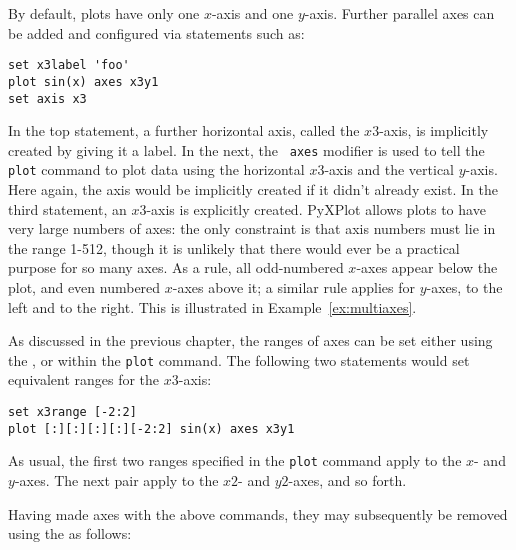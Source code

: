 By default, plots have only one $x$-axis and one $y$-axis. Further parallel
axes can be added and configured via statements such as:

\begin{verbatim}
set x3label 'foo'
plot sin(x) axes x3y1
set axis x3
\end{verbatim}

\noindent In the top statement, a further horizontal axis, called the
$x3$-axis, is implicitly created by giving it a label. In the next, the {\tt
axes} modifier is used to tell the {\tt plot} command to plot data using the
horizontal $x3$-axis and the vertical $y$-axis. Here again, the axis would be
implicitly created if it didn't already exist.  In the third statement, an
$x3$-axis is explicitly created.  PyXPlot allows plots to have very large
numbers of axes: the only constraint is that axis numbers must lie in the range
1-512, though it is unlikely that there would ever be a practical purpose for
so many axes.  As a rule, all odd-numbered $x$-axes appear below the plot, and
even numbered $x$-axes above it; a similar rule applies for $y$-axes, to the
left and to the right.  This is illustrated in Example~\ref{ex:multiaxes}.


As discussed in the previous chapter, the ranges of axes can be set either
using the , or within the {\tt plot} command. The following
two statements would set equivalent ranges for the $x3$-axis:

\begin{verbatim}
set x3range [-2:2]
plot [:][:][:][:][-2:2] sin(x) axes x3y1
\end{verbatim}

\noindent As usual, the first two ranges specified in the {\tt plot} command
apply to the $x$- and $y$-axes. The next pair apply to the $x2$- and $y2$-axes,
and so forth.

 Having made axes
with the above commands, they may subsequently be removed using the
 as follows:

